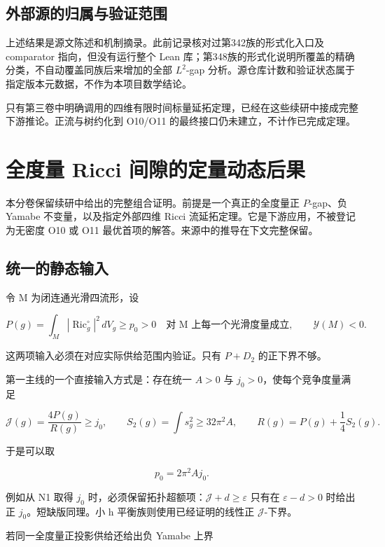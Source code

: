\documentclass[UTF8,11pt,openany,fontset=none]{ctexbook}
\theoremstyle{definition}
\theoremstyle{remark}
\begin{document}
\section{外部源的归属与验证范围}\label{v2-ux5916ux90e8ux6e90ux7684ux5f52ux5c5eux4e0eux9a8cux8bc1ux8303ux56f4}

上述结果是源文陈述和机制摘录。此前记录核对过第342族的形式化入口及 comparator 指向，但没有运行整个 Lean 库；第348族的形式化说明所覆盖的精确分类，不自动覆盖同族后来增加的全部 \(L^2\)-gap 分析。源仓库计数和验证状态属于指定版本元数据，不作为本项目数学结论。

只有第三卷中明确调用的四维有限时间标量延拓定理，已经在这些续研中接成完整下游推论。正流与树约化到 O10/O11 的最终接口仍未建立，不计作已完成定理。


\chapter{全度量 Ricci 间隙的定量动态后果}
本分卷保留续研中给出的完整组合证明。前提是一个真正的全度量正 \(P\)-gap、负 Yamabe 不变量，以及指定外部四维 Ricci 流延拓定理。它是下游应用，不被登记为无密度 O10 或 O11 最优首项的解答。来源中的推导在下文完整保留。\cite{R02,OAI351Flow,Ishida2008}

\section{统一的静态输入}\label{v3-ux7edfux4e00ux7684ux9759ux6001ux8f93ux5165}

令 M 为闭连通光滑四流形，设

\[
 P(g)=\int_M|\operatorname{Ric}^{\circ}_g|^2\,dV_g\ge p_0>0
 \quad\text{对 M 上每一个光滑度量成立},
 \qquad \mathcal Y(M)<0.
\]

这两项输入必须在对应实际供给范围内验证。只有 \(P+D_2\) 的正下界不够。

第一主线的一个直接输入方式是：存在统一 \(A>0\) 与 \(j_0>0\)，使每个竞争度量满足

\[
 \mathcal J(g)=\frac{4P(g)}{R(g)}\ge j_0,
 \qquad S_2(g)=\int s_g^2\ge32\pi^2A,
 \qquad R(g)=P(g)+\frac14S_2(g).
\]

于是可以取

\[
 \boxed{p_0=2\pi^2 A j_0.}
\]

例如从 N1 取得 \(j_0\) 时，必须保留拓扑超额项：\(\mathcal J+d\ge\varepsilon\) 只有在 \(\varepsilon-d>0\) 时给出正 \(j_0\)。短缺版同理。小 h 平衡族则使用已经证明的线性正 \(\mathcal J\)-下界。

若同一全度量正投影供给还给出负 Yamabe 上界
\end{document}
